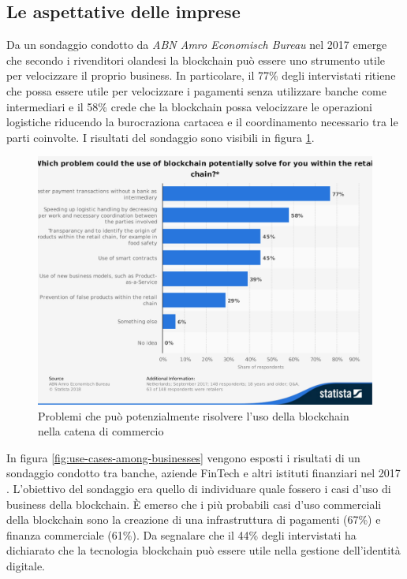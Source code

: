 \subsection{Le aspettative delle imprese}

Da un sondaggio condotto da \textit{ABN Amro Economisch Bureau} nel 2017 \cite{potential-blockchain-applications}
emerge che secondo i rivenditori olandesi la blockchain può essere uno strumento
utile per velocizzare il proprio business. In particolare,
il 77\% degli intervistati ritiene che possa essere utile per velocizzare
i pagamenti senza utilizzare banche come intermediari e il 58\% crede che
la blockchain possa velocizzare le operazioni logistiche riducendo la burocraziona cartacea
e il coordinamento necessario tra le parti coinvolte.
I risultati del sondaggio sono visibili in figura \ref{fig:potential-blockchain-applications}.
\begin{figure}[H]
	\centering
	\includegraphics[width=.6\linewidth]{images/chap_intro/potential-blockchain-applications.pdf}
	\caption{Problemi che può potenzialmente risolvere l'uso della blockchain
		nella catena di commercio \cite{potential-blockchain-applications}}
	\label{fig:potential-blockchain-applications}
\end{figure}

In figura \ref{fig:use-cases-among-businesses} vengono esposti i risultati di un sondaggio
condotto tra banche, aziende FinTech e altri istituti finanziari nel 2017 \cite{use-cases-among-businesses}.
L'obiettivo
del sondaggio era quello di individuare quale fossero i casi d'uso di business
della blockchain. È emerso che i più probabili casi d'uso commerciali della blockchain
sono la creazione di una infrastruttura di pagamenti (67\%) e finanza commerciale (61\%).
Da segnalare che il 44\% degli intervistati ha dichiarato che
la tecnologia blockchain può essere utile nella gestione dell'identità digitale.

